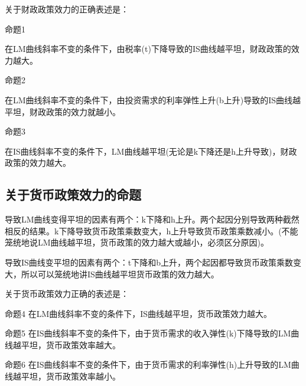 \documentclass{article}
\begin{document}
关于财政政策效力的正确表述是：

命题1 

在LM曲线斜率不变的条件下，由税率(t)下降导致的IS曲线越平坦，财政政策的效力越大。

\hspace*{\fill}

命题2

在LM曲线斜率不变的条件下，由投资需求的利率弹性上升(b上升)导致的IS曲线越平坦，财政政策的效力就越小。

\hspace*{\fill}

命题3

在IS曲线斜率不变的条件下，LM曲线越平坦(无论是k下降还是h上升导致)，财政政策的效力越大。

\subsection{关于货币政策效力的命题}
导致LM曲线变得平坦的因素有两个：k下降和h上升。两个起因分别导致两种截然相反的结果。k下降导致货币政策乘数变大，h上升导致货币政策乘数减小。(不能笼统地说LM曲线越平坦，货币政策的效力越大或越小，必须区分原因)。

导致IS曲线变平坦的因素有两个：t下降和b上升，两个起因都导致货币政策乘数变大，所以可以笼统地讲IS曲线越平坦货币政策的效力越大。

\hspace*{\fill}

关于货币政策效力正确的表述是：

\hspace*{\fill}

命题4 在LM曲线斜率不变的条件下，IS曲线越平坦，货币政策效力越大。

\hspace*{\fill}

命题5 在IS曲线斜率不变的条件下，由于货币需求的收入弹性(k)下降导致的LM曲线越平坦，货币政策效率越大。

\hspace*{\fill}

命题6 在IS曲线斜率不变的条件下，由于货币需求的利率弹性(h)上升导致的LM曲线越平坦，货币政策效率越小。
\end{document}
